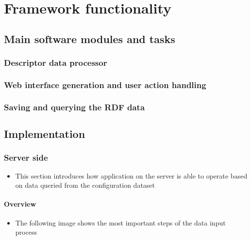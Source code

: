 
\chapter{Framework functionality} \label{5}

\section{Main software modules and tasks} \label{51}

\subsection{Descriptor data processor} \label{511}
\subsection{Web interface generation and user action handling} \label{512}
\subsection{Saving and querying the RDF data} \label{513}




\section{Implementation}

\subsection{Server side} \label{512}


\begin{itemize}
	\item This section introduces how application on the server is able to operate based on data queried from the configuration dataset
	
\end{itemize}

\subsubsection{Overview}

\begin{itemize}
	\item The following image shows the most important steps of the data input process
\end{itemize}



